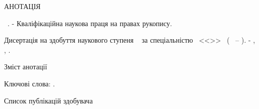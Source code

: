 \noindent
АНОТАЦІЯ						

\vspace{0.7cm}
\noindent
\thesisAuthorFIO~\thesisTitle. - Кваліфікаційна наукова праця на правах рукопису.

\vspace{0.7cm}
\noindent
Дисертація на здобуття наукового ступеня \thesisDegree~ 
за спеціальністю \thesisSpecialtyNumber~<<\thesisSpecialtyTitle>>~
(\thesisKnowledgeNumber~ -- \thesisKnowledgeTitle). - \thesisOrganization, \thesisCity, \thesisYear.

\vspace{0.7cm}
Зміст анотації

\vspace{0.7cm}
\noindent
Ключові слова: \keywords.

\vspace{0.7cm}
Список публікацій здобувача 



\clearpage
